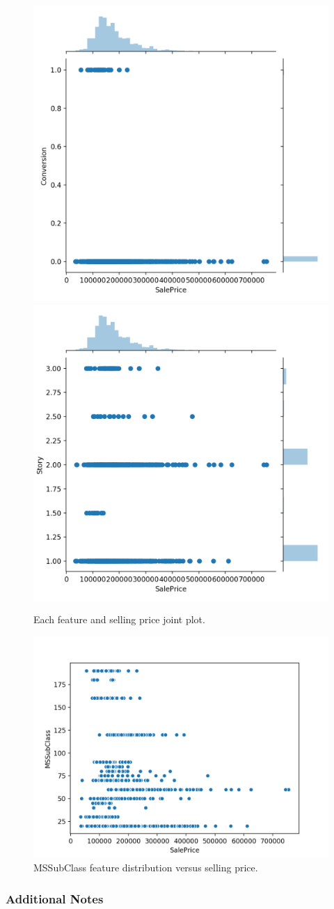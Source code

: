 \documentclass[letterpaper]{article}
\begin{document}
\begin{figure}
\includegraphics[width=.33\textwidth]{Figure_7.png}
\includegraphics[width=.33\textwidth]{Figure_8.png}
\caption{Each feature and selling price joint plot.}
\label{fig:msDivisions}
\end{figure}

\begin{figure}
\begin{center}
\includegraphics[width=\columnwidth]{MSSubClassJointplot.png}
\caption{MSSubClass feature distribution versus selling price.}
\label{fig:msWhole}
\end{center}
\end{figure}

\subsubsection{Additional Notes}
\end{document}
